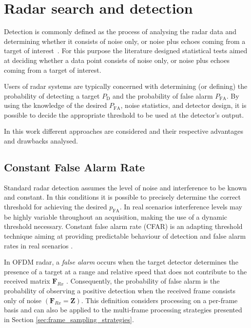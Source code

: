 
	\section{Radar search and detection}
	\label{sec:radar_search_detection}
		Detection is commonly defined as the process of analysing the radar data and determining whether it consists of noise only, or noise plus echoes coming from a target of interest~\cite{Richards_Scheer_Holm_2010}. 
		For this purpose the literature designed statistical tests aimed at deciding whether a data point consists of noise only, or noise plus echoes coming from a target of interest.
		
		Users of radar systems are typically concerned with determining (or defining) the probability of detecting a target $P_\text{D}$ and the probability of false alarm $P_\text{{FA}}$.  By using the knowledge of the desired $P_\text{{FA}}$, noise statistics, and detector design, it is possible to decide the appropriate threshold to be used at the detector's output.
		
		In this work different approaches are considered and their respective advantages and drawbacks analysed. 



		\subsection{Constant False Alarm Rate}
	
				Standard radar detection assumes the level of noise and interference to be known and constant. In this conditions it is possible to precisely determine the correct threshold for achieving the desired $	p_\text{FA}$. In real scenarios interference levels may be highly variable throughout an acquisition, making the use of a dynamic threshold necessary. Constant false alarm rate (CFAR) is an adapting threshold technique aiming at providing predictable behaviour of detection and false alarm rates in real scenarios \cite{Richards_2014}.
				
				
				In OFDM radar, a \textit{false alarm} occurs when the target detector determines the presence of a target at a range and relative speed that does not contribute to the received matrix $\mathbf F_{Rx}$ \cite{Braun2014OFDMRA}. 
				Consequently, the probability of false alarm is the probability of observing a positive detection when the received frame consists only of noise $(\mathbf F_{Rx} = \mathbf Z)$. 
				This definition considers processing on a per-frame basis and can also be applied to the multi-frame processing strategies presented in Section \ref{sec:frame_sampling_strategies}. 
				
